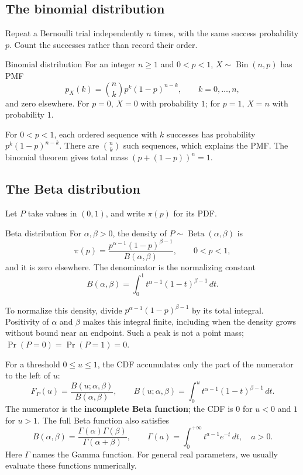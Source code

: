 \documentclass[a4paper,12pt,oneside]{report}
\begin{document}
\subsection{The binomial distribution}
\label{sec:binomial-distribution}
Repeat a Bernoulli trial independently $n$ times, with the same
success probability $p$. Count the successes rather than record
their order.
\begin{frameddefn}{Binomial distribution}
For an integer $n\geq1$ and $0<p<1$, $X\sim\operatorname{Bin}(n,p)$
has PMF
\[
  p_X(k)=\binom nk p^k(1-p)^{n-k},\qquad k=0,\ldots,n,
\]
and zero elsewhere. For $p=0$, $X=0$ with probability $1$;
for $p=1$, $X=n$ with probability $1$.
\end{frameddefn}
For $0<p<1$, each ordered sequence with $k$ successes has
probability $p^k(1-p)^{n-k}$. There are $\binom nk$ such sequences,
which explains the PMF. The binomial theorem gives total mass
$(p+(1-p))^n=1$.

\subsection{The Beta distribution}
\label{sec:beta-distribution}

Let $P$ take values in $(0,1)$, and write $\pi(p)$ for its PDF.

\begin{frameddefn}{Beta distribution}
\label{def:beta-distribution}
For $\alpha,\beta>0$, the density of
$P\sim\operatorname{Beta}(\alpha,\beta)$ is
\[
  \pi(p)=\frac{p^{\alpha-1}(1-p)^{\beta-1}}{B(\alpha,\beta)},
  \qquad 0<p<1,
\]
and it is zero elsewhere. The denominator is the normalizing
constant
\[
  B(\alpha,\beta)=\int_0^1
       t^{\alpha-1}(1-t)^{\beta-1}\,dt.
\]
\end{frameddefn}

To normalize this density, divide
$p^{\alpha-1}(1-p)^{\beta-1}$ by its total integral. Positivity of
$\alpha$ and $\beta$ makes this integral finite, including when
the density grows without bound near an endpoint. Such a peak is
not a point mass; $\Pr(P=0)=\Pr(P=1)=0$.

For a threshold $0\leq u\leq1$, the CDF accumulates only the
part of the numerator to the left of $u$:
\[
  F_P(u)=\frac{B(u;\alpha,\beta)}{B(\alpha,\beta)},
  \qquad
  B(u;\alpha,\beta)=\int_0^u
        t^{\alpha-1}(1-t)^{\beta-1}\,dt.
\]
The numerator is the \textbf{incomplete Beta function}; the CDF
is $0$ for $u<0$ and $1$ for $u>1$. The full Beta function also
satisfies
\[
  B(\alpha,\beta)
    =\frac{\Gamma(\alpha)\Gamma(\beta)}{\Gamma(\alpha+\beta)},
  \qquad
  \Gamma(a)=\int_0^{+\infty}t^{a-1}e^{-t}\,dt,\quad a>0.
\]
Here $\Gamma$ names the Gamma function. For general real
parameters, we usually evaluate these functions numerically.
\end{document}

